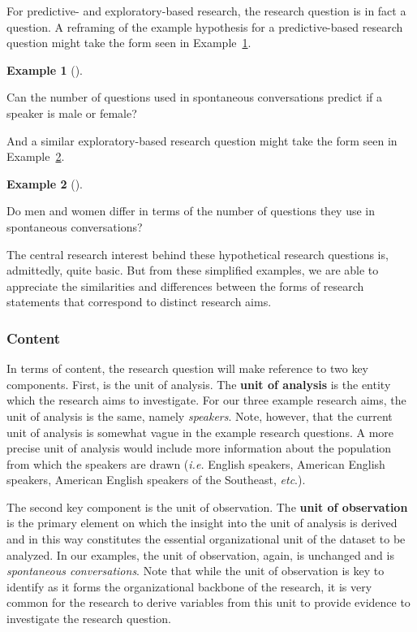 \documentclass[
  letterpaper,
  DIV=11,
  numbers=noendperiod]{scrreport}
\theoremstyle{definition}
\newtheorem{example}{Example}[chapter]
\theoremstyle{remark}
\begin{document}
For predictive- and exploratory-based research, the research question is
in fact a question. A reframing of the example hypothesis for a
predictive-based research question might take the form seen in
Example~\ref{exm-fr-form-pred}.

\begin{example}[]\protect\hypertarget{exm-fr-form-pred}{}\label{exm-fr-form-pred}

Can the number of questions used in spontaneous conversations predict if
a speaker is male or female?

\end{example}

And a similar exploratory-based research question might take the form
seen in Example~\ref{exm-fr-form-exp}.

\begin{example}[]\protect\hypertarget{exm-fr-form-exp}{}\label{exm-fr-form-exp}

Do men and women differ in terms of the number of questions they use in
spontaneous conversations?

\end{example}

The central research interest behind these hypothetical research
questions is, admittedly, quite basic. But from these simplified
examples, we are able to appreciate the similarities and differences
between the forms of research statements that correspond to distinct
research aims.

\hypertarget{sec-fr-question-content}{%
\subsubsection{Content}\label{sec-fr-question-content}}

In terms of content, the research question will make reference to two
key components. First, is the unit of analysis. The \textbf{unit of
analysis} is the entity which the research aims to investigate. For our
three example research aims, the unit of analysis is the same, namely
\emph{speakers}. Note, however, that the current unit of analysis is
somewhat vague in the example research questions. A more precise unit of
analysis would include more information about the population from which
the speakers are drawn (\emph{i.e.} English speakers, American English
speakers, American English speakers of the Southeast, \emph{etc}.).

The second key component is the unit of observation. The \textbf{unit of
observation} is the primary element on which the insight into the unit
of analysis is derived and in this way constitutes the essential
organizational unit of the dataset to be analyzed. In our examples, the
unit of observation, again, is unchanged and is \emph{spontaneous
conversations}. Note that while the unit of observation is key to
identify as it forms the organizational backbone of the research, it is
very common for the research to derive variables from this unit to
provide evidence to investigate the research question.
\end{document}
